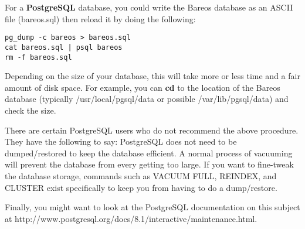 For a {\bf PostgreSQL} database, you could write the Bareos database as an
ASCII file (bareos.sql) then reload it by doing the following:

\footnotesize
\begin{verbatim}
pg_dump -c bareos > bareos.sql
cat bareos.sql | psql bareos
rm -f bareos.sql
\end{verbatim}
\normalsize

Depending on the size of your database, this will take more or less time and a
fair amount of disk space. For example, you can {\bf cd} to the location of
the Bareos database (typically /usr/local/pgsql/data or possible
/var/lib/pgsql/data) and check the size.

There are certain PostgreSQL users who do not recommend the above
procedure. They have the following to say:
PostgreSQL does not
need to be dumped/restored to keep the database efficient.  A normal
process of vacuuming will prevent the database from every getting too
large.  If you want to fine-tweak the database storage, commands such
as VACUUM FULL, REINDEX, and CLUSTER exist specifically to keep you
from having to do a dump/restore.

Finally, you might want to look at the PostgreSQL documentation on
this subject at
{http://www.postgresql.org/docs/8.1/interactive/maintenance.html}.




